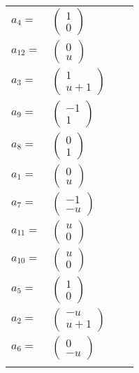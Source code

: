 \documentclass[1p]{elsarticle_modified}
\theoremstyle{definition}
\begin{document}
\begin{tabular}{m{7pt} m{180pt} m{7pt} m{180pt} }
\flushright $a_{4}=$&$\begin{pmatrix}1\\0\end{pmatrix}$ \\
\flushright $a_{12}=$&$\begin{pmatrix}0\\u\end{pmatrix}$ \\
\flushright $a_{3}=$&$\begin{pmatrix}1\\u+1\end{pmatrix}$ \\
\flushright $a_{9}=$&$\begin{pmatrix}-1\\1\end{pmatrix}$ \\
\flushright $a_{8}=$&$\begin{pmatrix}0\\1\end{pmatrix}$ \\
\flushright $a_{1}=$&$\begin{pmatrix}0\\u\end{pmatrix}$ \\
\flushright $a_{7}=$&$\begin{pmatrix}-1\\- u\end{pmatrix}$ \\
\flushright $a_{11}=$&$\begin{pmatrix}u\\0\end{pmatrix}$ \\
\flushright $a_{10}=$&$\begin{pmatrix}u\\0\end{pmatrix}$ \\
\flushright $a_{5}=$&$\begin{pmatrix}1\\0\end{pmatrix}$ \\
\flushright $a_{2}=$&$\begin{pmatrix}- u\\u+1\end{pmatrix}$ \\
\flushright $a_{6}=$&$\begin{pmatrix}0\\- u\end{pmatrix}$\\&\end{tabular}
\end{document}
